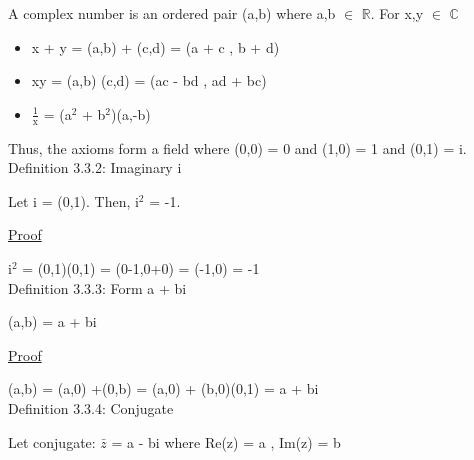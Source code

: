 	\qquad A complex number is an ordered pair (a,b) where a,b $\in$ $ \mathbb{R} $.
	For x,y $\in$ $\mathbb{C}$
	\begin{itemize}[leftmargin=2cm]
		\item x + y = (a,b) + (c,d) = (a + c , b + d)
		\item xy = (a,b) (c,d) = (ac - bd , ad + bc)
		\item $\frac{1}{\text{x}}$  = (a$^2$ + b$^2$)(a,-b)
	\end{itemize}

	Thus, the axioms form a field where (0,0) = 0 and (1,0) = 1 and (0,1) = i. \\

	{ \color{blue} Definition 3.3.2: Imaginary i } 
	
	\qquad Let i = (0,1). Then, i$^2$ = -1.

	{ \color{magenta} \underline{Proof} } 
	
	i$^\text{2}$ = (0,1)(0,1) = (0-1,0+0) = (-1,0) = -1 \\

	{ \color{blue} Definition 3.3.3: Form a + bi } 
	
	\qquad (a,b) = a + bi

	{ \color{magenta} \underline{Proof} } 
	
	(a,b) = (a,0) +(0,b) = (a,0) + (b,0)(0,1) = a + bi \\

	{ \color{blue} Definition 3.3.4: Conjugate }
	
	\qquad Let conjugate: $\bar{z}$ = a - bi where Re(z) = a , Im(z) = b \\

